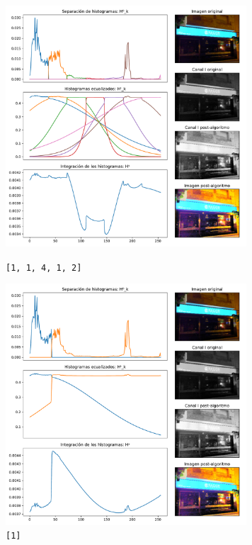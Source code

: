 \begin{figure}[H]
\begin{minipage}[c]{0.48\linewidth}
  \includegraphics[height=9cm]{imgs/backlightnacion-1111111.pdf}
  \caption{\texttt{[1, 1, 4, 1, 2]}}
\end{minipage}
\hfill
\begin{minipage}[c]{0.48\linewidth}
  \includegraphics[height=9cm]{imgs/backlightnacion-15.pdf}
  \caption{\texttt{[1]}}
\end{minipage}%
\end{figure}
